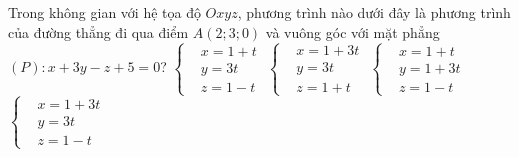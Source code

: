 \begin{ex}%
	Trong không gian với hệ tọa độ $Oxyz$, phương trình nào dưới đây là phương trình của đường thẳng đi qua điểm $A(2;3;0)$ và vuông góc với mặt phẳng $(P)\colon x+3y-z+5=0$? 
	\choice
	{\True $\left\{\begin{aligned}& x=1+t \\
		& y=3t \\
		& z=1-t 
		\end{aligned}\right.$}
	{$\left\{\begin{aligned}& x=1+3t \\
		& y=3t \\
		& z=1+t 
		\end{aligned}\right.$	}
	{$\left\{\begin{aligned}& x=1+t \\
		& y=1+3t \\
		& z=1-t 
		\end{aligned}\right.$	}
	{$\left\{\begin{aligned}& x=1+3t \\
		& y=3t \\
		& z=1-t 
		\end{aligned}\right.$}
\end{ex}
